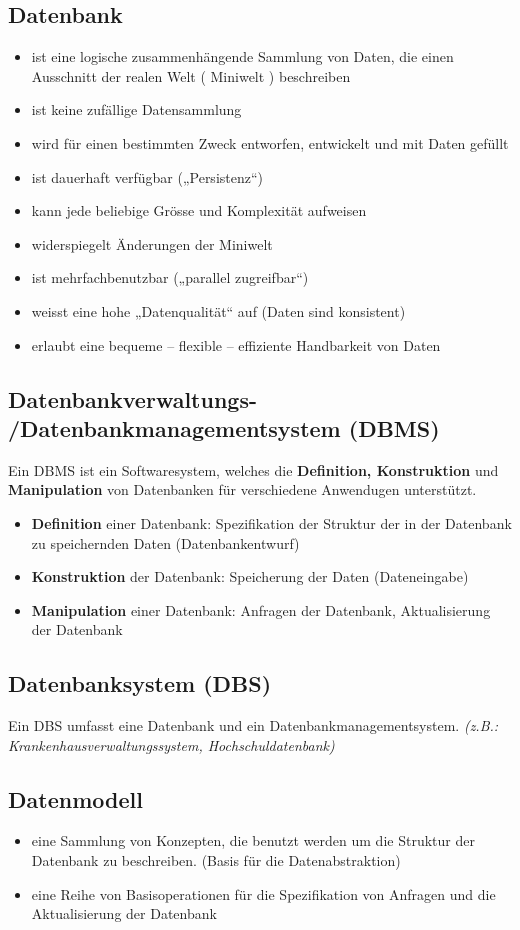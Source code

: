 \documentclass[10pt]{scrartcl}
\begin{document}
\subsection{Datenbank}
\begin{itemize}
\item ist eine logische zusammenhängende Sammlung von Daten, die einen Ausschnitt der realen Welt ( Miniwelt ) beschreiben
\item ist keine zufällige Datensammlung
\item wird für einen bestimmten Zweck entworfen, entwickelt und mit Daten gefüllt
\item ist dauerhaft verfügbar („Persistenz“)
\item kann jede beliebige Grösse und Komplexität aufweisen
\item widerspiegelt Änderungen der Miniwelt
\item ist mehrfachbenutzbar („parallel zugreifbar“)
\item weisst eine hohe „Datenqualität“ auf (Daten sind konsistent)
\item erlaubt eine bequeme – flexible – effiziente Handbarkeit von Daten
\end{itemize}

\subsection{Datenbankverwaltungs- /Datenbankmanagementsystem (DBMS)}
Ein DBMS ist ein Softwaresystem, welches die {\bf Definition, Konstruktion} und {\bf Manipulation} von Datenbanken für verschiedene Anwendugen unterstützt.
\begin{itemize}
\item {\bf Definition} einer Datenbank: Spezifikation der Struktur der in der Datenbank zu speichernden Daten (Datenbankentwurf)
\item {\bf Konstruktion} der Datenbank: Speicherung der Daten (Dateneingabe)
\item {\bf Manipulation} einer Datenbank: Anfragen der Datenbank, Aktualisierung der Datenbank
\end{itemize}
\subsection{Datenbanksystem (DBS)}
Ein DBS umfasst eine Datenbank und ein Datenbankmanagementsystem. {\it (z.B.: Krankenhausverwaltungssystem, Hochschuldatenbank)}
\subsection{Datenmodell}
\begin{itemize}
\item eine Sammlung von Konzepten, die benutzt werden um die Struktur der
Datenbank zu beschreiben. (Basis für die Datenabstraktion)
\item eine Reihe von Basisoperationen für die Spezifikation von Anfragen und die
Aktualisierung der Datenbank
\end{itemize}
\end{document}
